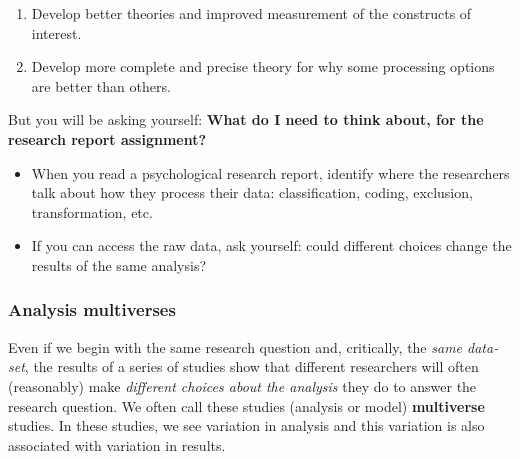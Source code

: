 \documentclass[
  letterpaper,
  DIV=11,
  numbers=noendperiod]{scrreprt}
\providecommand{\tightlist}{%
  \setlength{\itemsep}{0pt}\setlength{\parskip}{0pt}}\usepackage{longtable,booktabs,array}
\begin{document}
\begin{enumerate}
\def\labelenumi{\arabic{enumi}.}
\tightlist
\item
  Develop better theories and improved measurement of the constructs of
  interest.
\item
  Develop more complete and precise theory for why some processing
  options are better than others.
\end{enumerate}

But you will be asking yourself: \textbf{What do I need to think about,
for the research report assignment?}

\begin{tcolorbox}[enhanced jigsaw, opacitybacktitle=0.6, title=\textcolor{quarto-callout-tip-color}{\faLightbulb}\hspace{0.5em}{Tip}, arc=.35mm, colbacktitle=quarto-callout-tip-color!10!white, colframe=quarto-callout-tip-color-frame, leftrule=.75mm, opacityback=0, breakable, titlerule=0mm, left=2mm, bottomrule=.15mm, toprule=.15mm, colback=white, coltitle=black, bottomtitle=1mm, toptitle=1mm, rightrule=.15mm]

\begin{itemize}
\tightlist
\item
  When you read a psychological research report, identify where the
  researchers talk about how they process their data: classification,
  coding, exclusion, transformation, etc.
\item
  If you can access the raw data, ask yourself: could different choices
  change the results of the same analysis?
\end{itemize}

\end{tcolorbox}

\hypertarget{sec-multiverseanalysis}{%
\subsubsection{Analysis multiverses}\label{sec-multiverseanalysis}}

Even if we begin with the same research question and, critically, the
\emph{same data-set}, the results of a series of studies show that
different researchers will often (reasonably) make \emph{different
choices about the analysis} they do to answer the research question. We
often call these studies (analysis or model) \textbf{multiverse}
studies. In these studies, we see variation in analysis and this
variation is also associated with variation in results.
\end{document}

